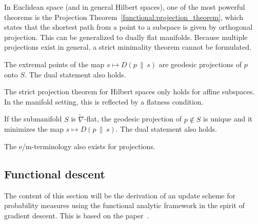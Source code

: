     In Euclidean space (and in general Hilbert spaces), one of the most powerful theorems is the Projection Theorem~\ref{functional:projection_theorem}, which states that the shortest path from a point to a subspace is given by orthogonal projection. This can be generalized to dually flat manifolds.
    Because multiple projections exist in general, a strict minimality theorem cannot be formulated.
    \begin{theorem}
        The extremal points of the map $s\mapsto D(p\,\|\,s)$ are geodesic projections of $p$ onto $S$. The dual statement also holds.
    \end{theorem}
    The strict projection theorem for Hilbert spaces only holds for affine subspaces. In the manifold setting, this is reflected by a flatness condition.
    \begin{property}
        If the submanifold $S$ is $\widetilde{\nabla}$-flat, the geodesic projection of $p\not\in S$ is unique and it minimizes the map $s\mapsto D(p\,\|\,s)$. The dual statement also holds.
    \end{property}

    The e/m-terminology also exists for projections.

\subsection{Functional descent}

    The content of this section will be the derivation of an update scheme for probability measures using the functional analytic framework in the spirit of gradient descent. This is based on the paper~\cite{chu_probability_2019}.

